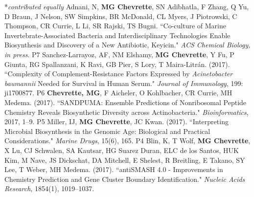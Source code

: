 


\begin{cvpubs}
  \cvpub
    {\hspace{-1cm} *\textit{contributed equally}} %
    {} %
  \cvpub
    {Adnani, N, \textbf{MG Chevrette}, SN Adibhatla, F Zhang, Q Yu, D Braun, J Nelson, SW Simpkins, BR McDonald, CL Myers, J Piotrowski, C Thompson, CR Currie, L Li, SR Rajski, TS Bugni. ``Co-culture of Marine Invertebrate-Associated Bacteria and Interdisciplinary Technologies Enable Biosynthesis and Discovery of a New Antibiotic, Keyicin." \textit{ACS Chemical Biology, in press}.  \textit{} } %
    {P7} %
  \cvpub
    {Sanchez-Larrayoz, AF, NM Elshamy, \textbf{MG Chevrette}, Y Fu, P Giunta, RG Spallanzani, K Ravi, GB Pier, S Lory, T Maira-Litr\'{a}n. (2017). ``Complexity of Complement-Resistance Factors Expressed by \textit{Acinetobacter baumannii} Needed for Survival in Human Serum." \textit{Journal of Immunology}, 199: ji1700877. \textit{} }%
    {P6} %
  \cvpub
    {\textbf{Chevrette, MG}, F Aicheler, O Kohlbacher, CR Currie, MH Medema. (2017). ``SANDPUMA: Ensemble Predictions of Nonribosomal Peptide Chemistry Reveals Biosynthetic Diversity across Actinobacteria." \textit{Bioinformatics}, 2017, 1–9. \textit{} } %
    {P5} %
  \cvpub
    {Miller, IJ, \textbf{MG Chevrette}, JC Kwan. (2017). ``Interpreting Microbial Biosynthesis in the Genomic Age: Biological and Practical Considerations." \textit{Marine Drugs}, 15(6), 165. \textit{} } %
    {P4} %
  \cvpub
    {Blin, K, T Wolf, \textbf{MG Chevrette}, X Lu, CJ Schwalen, SA Kautsar, HG Suarez Duran, ELC de los Santos, HUK Kim, M Nave, JS Dickschat, DA Mitchell, E Shelest, R Breitling, E Takano, SY Lee, T Weber, MH Medema. (2017). ``antiSMASH 4.0 - Improvements in Chemistry Prediction and Gene Cluster Boundary Identification." \textit{Nucleic Acids Research}, 1854(1), 1019–1037. \textit{} }  %

\end{cvpubs}
